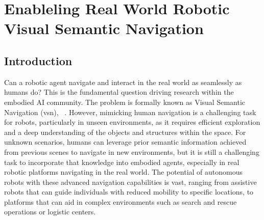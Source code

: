 \chapter{Enableling Real World Robotic Visual Semantic Navigation}\label{ch:ros4vsn:-enable-real-world-robotic-visual-semantic-navigation}

\section{Introduction}\label{sec:introduction_ros4vsn}

Can a robotic agent navigate and interact in the real world as seamlessly as humans do?
This is the fundamental question driving research within the embodied AI community.
The problem is formally known as Visual Semantic Navigation (\acrshort{vsn}), \eg~\cite{ramrakhya2023,Cai2024DGMemLV,chang2020}.
However, mimicking human navigation is a challenging task for robots, particularly in unseen environments, as it requires efficient exploration and a deep understanding of the objects and structures within the space.
For unknown scenarios, humans can leverage prior semantic information achieved from previous scenes to navigate in new environments, but it is still a challenging task to incorporate that knowledge into embodied agents, especially in real robotic platforms navigating in the real world.
The potential of autonomous robots with these advanced navigation capabilities is vast, ranging from assistive robots that can guide individuals with reduced mobility to specific locations, to platforms that can aid in complex environments such as search and rescue operations or logistic centers.

